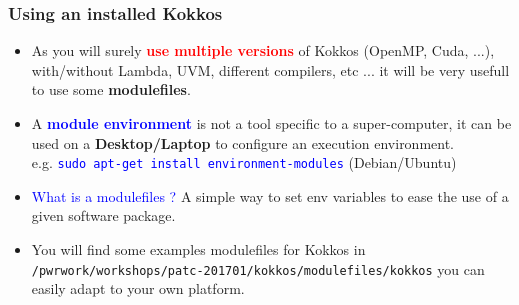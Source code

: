 \begin{frame}[fragile=singleslide]
  \frametitle{Using an installed Kokkos}

  \begin{itemize}
  \item As you will surely \textcolor{red}{\textbf{use multiple versions}} of Kokkos (OpenMP, Cuda, ...), with/without Lambda, UVM, different compilers, etc ... it will be very usefull to use some \textbf{modulefiles}.
  \item A \textcolor{blue}{\textbf{module environment}} is not a tool specific to a super-computer, it can be used on a \textbf{Desktop/Laptop} to configure an execution environment.\\
    e.g. \textcolor{blue}{\texttt{sudo apt-get install environment-modules}} (Debian/Ubuntu)
  \item \textcolor{blue}{What is a modulefiles ?}
    A simple way to set env variables to ease the use of a given software package.
  \item You will find some examples modulefiles for Kokkos in \texttt{/pwrwork/workshops/patc-201701/kokkos/modulefiles/kokkos} you can easily adapt to your own platform.
  \end{itemize}

\end{frame}

